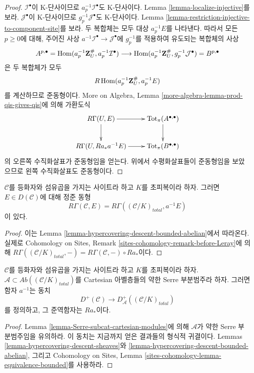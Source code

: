 \begin{proof}
\medskip\noindent
$\mathcal{I}^\bullet$이 K-단사이므로
$a_p^{-1}\mathcal{I}^\bullet$도 K-단사이다. Lemma
\ref{lemma-localize-injective}를 보라. $\mathcal{J}^\bullet$이
K-단사이므로 $g_p^{-1}\mathcal{J}^\bullet$도 K-단사이다. Lemma
\ref{lemma-restriction-injective-to-component-site}를 보라.
두 복합체는 모두 대상 $a_p^{-1}E$를 나타낸다. 따라서 모든
$p \geq 0$에 대해, 주어진 사상
$a^{-1}\mathcal{I}^\bullet \to \mathcal{J}^\bullet$에 $g_p^{-1}$를
적용하여 유도되는 복합체의 사상
$$
A^{p, \bullet} = \mathop{\mathrm{Hom}}\nolimits(a_p^{-1}\mathbf{Z}_U^\#, a_p^{-1}\mathcal{I}^\bullet)
\longrightarrow
\mathop{\mathrm{Hom}}\nolimits(a_p^{-1}\mathbf{Z}_U^\#, g_p^{-1}\mathcal{J}^\bullet) = B^{p, \bullet}
$$
은 두 복합체가 모두
$$
R\mathop{\mathrm{Hom}}\nolimits(a_p^{-1}\mathbf{Z}_U^\#, a_p^{-1}E)
$$
를 계산하므로 준동형이다.
More on Algebra, Lemma \ref{more-algebra-lemma-prod-qis-gives-qis}에 의해
가환도식
$$
\xymatrix{
R\Gamma(U, E) \ar[r] \ar[d] &
\text{Tot}_\pi(A^{\bullet, \bullet}) \ar[d] \\
R\Gamma(U, Ra_*a^{-1}E) \ar[r] &
\text{Tot}_\pi(B^{\bullet, \bullet})
}
$$
의 오른쪽 수직화살표가 준동형임을 얻는다. 위에서 수평화살표들이
준동형임을 보았으므로 왼쪽 수직화살표도 준동형이다.
\end{proof}

\begin{lemma}
\label{lemma-compare-cohomology-hypercovering}
$\mathcal{C}$를 등화자와 섬유곱을 가지는 사이트라 하고 $K$를
초피복이라 하자. 그러면 $E \in D(\mathcal{C})$에 대해 정준 동형
$$
R\Gamma(\mathcal{C}, E) =
R\Gamma((\mathcal{C}/K)_{total}, a^{-1}E)
$$
이 있다.
\end{lemma}

\begin{proof}
이는 Lemma \ref{lemma-hypercovering-descent-bounded-abelian}에서 따라온다.
실제로 Cohomology on Sites, Remark
\ref{sites-cohomology-remark-before-Leray}에 의해
$R\Gamma((\mathcal{C}/K)_{total}, -) =
R\Gamma(\mathcal{C}, -) \circ Ra_*$이다.
\end{proof}

\begin{lemma}
\label{lemma-hypercovering-equivalence-bounded}
$\mathcal{C}$를 등화자와 섬유곱을 가지는 사이트라 하고 $K$를
초피복이라 하자. $\mathcal{A} \subset
\textit{Ab}((\mathcal{C}/K)_{total})$를 Cartesian 아벨층들의
약한 Serre 부분범주라 하자. 그러면 함자 $a^{-1}$는 동치
$$
D^+(\mathcal{C}) \longrightarrow D_\mathcal{A}^+((\mathcal{C}/K)_{total})
$$
를 정의하고, 그 준역함자는 $Ra_*$이다.
\end{lemma}

\begin{proof}
Lemma \ref{lemma-Serre-subcat-cartesian-modules}에 의해
$\mathcal{A}$가 약한 Serre 부분범주임을 유의하라. 이 동치는 지금까지
얻은 결과들의 형식적 귀결이다. Lemmas
\ref{lemma-hypercovering-descent-sheaves}와
\ref{lemma-hypercovering-descent-bounded-abelian}, 그리고 Cohomology on
Sites, Lemma \ref{sites-cohomology-lemma-equivalence-bounded}를 사용하라.
\end{proof}









